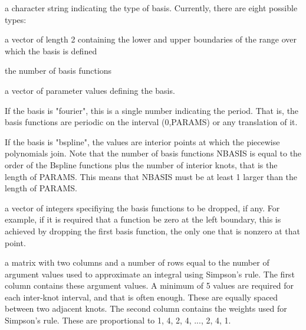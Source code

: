 \documentclass{article}
\begin{document}
\begin{Arguments}
\begin{ldescription}
\item[\code{type}] a character string indicating the type of basis.  Currently,
there are eight possible types:


\item[\code{rangeval}] a vector of length 2 containing the lower and upper boundaries
of the range over which the basis is defined

\item[\code{nbasis}] the number of basis functions

\item[\code{params}] a vector of parameter values defining the basis.

If the basis is "fourier", this is a single number indicating the
period.  That is, the basis functions are periodic on the interval
(0,PARAMS) or any translation of it.

If the basis is "bspline", the values are interior points at which
the piecewise polynomials join.  Note that the number of basis
functions NBASIS is equal to the order of the Bspline functions plus
the number of interior knots, that is the length of PARAMS.  This
means that NBASIS must be at least 1 larger than the length of PARAMS.

\item[\code{dropind}] a vector of integers specifiying the basis functions to
be dropped, if any.  For example, if it is required that
a function be zero at the left boundary, this is achieved
by dropping the first basis function, the only one that
is nonzero at that point.

\item[\code{quadvals}] a matrix with two columns and a number of rows equal to the number
of argument values used to approximate an integral using Simpson's
rule.  The first column contains these argument values.  A minimum
of 5 values are required for each inter-knot interval, and that is
often enough. These are equally spaced between two adjacent knots.
The second column contains the weights used for Simpson's rule.
These are proportional to 1, 4, 2, 4, ..., 2, 4, 1.


\end{ldescription}
\end{Arguments}
\end{document}
